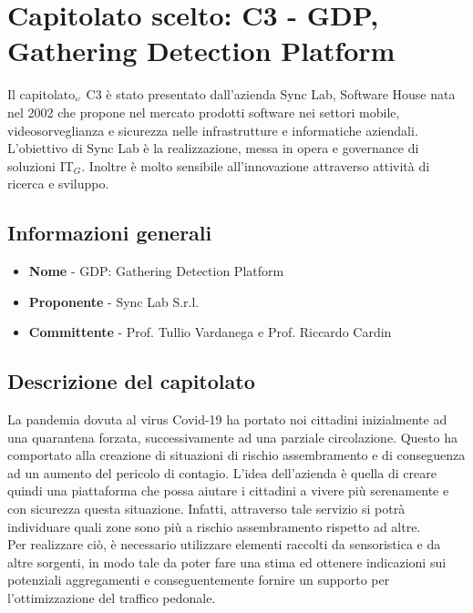 \chapter{Capitolato scelto: C3 - GDP, Gathering Detection Platform} \label{CapitolatoC3}

Il capitolato$_{\scaleto{G}{3pt}}$ C3 è stato presentato dall'azienda Sync Lab, Software House  nata nel 2002 che propone nel mercato prodotti software nei settori mobile, videosorveglianza e sicurezza nelle infrastrutture e informatiche aziendali. L’obiettivo di Sync Lab è la realizzazione, messa in opera e governance di soluzioni IT$_G$. Inoltre è molto sensibile all'innovazione attraverso attività di ricerca  e sviluppo.

\section{Informazioni generali} \label{C3InformazioniGenerali}
\begin{itemize}
	\item \textbf{Nome} - GDP: Gathering Detection Platform
	\item \textbf{Proponente} - Sync Lab S.r.l.
	\item \textbf{Committente} - Prof. Tullio Vardanega e Prof. Riccardo Cardin
\end{itemize}
\section{Descrizione del capitolato} \label{C3DescrizioneDelCapitolato}
La pandemia dovuta al  virus Covid-19 ha portato noi cittadini inizialmente ad una quarantena forzata, successivamente ad una parziale circolazione. Questo ha comportato alla creazione di situazioni di rischio assembramento e di conseguenza ad un aumento del  pericolo di contagio. L'idea dell'azienda è quella di creare quindi una piattaforma che possa aiutare i cittadini a vivere più serenamente e con sicurezza questa situazione. Infatti, attraverso tale servizio si potrà individuare quali zone sono più a rischio assembramento rispetto ad altre. \\
Per realizzare ciò, è necessario utilizzare elementi raccolti da sensoristica e da altre sorgenti, in modo tale da poter fare una stima ed ottenere indicazioni sui potenziali aggregamenti e conseguentemente fornire un supporto per l'ottimizzazione del traffico pedonale.
